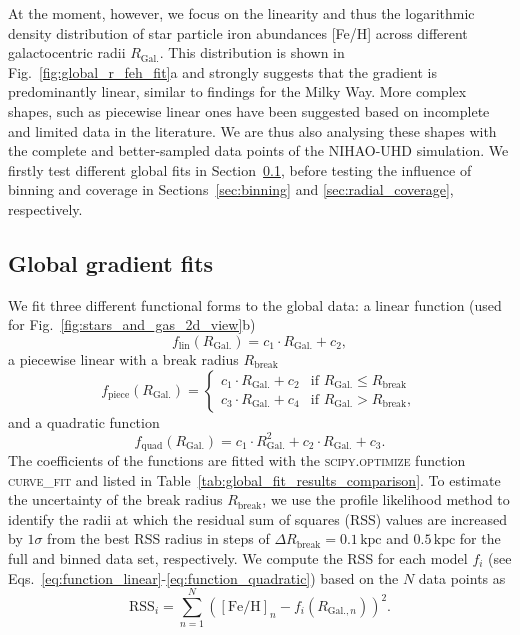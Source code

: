 \documentclass[twocolumn,apj,numberedappendix,appendixfloats,twocolappendix]{openjournal}
\begin{document}
\begin{CJK*}{UTF8}{gbsn}
At the moment, however, we focus on the linearity and thus the logarithmic density distribution of star particle iron abundances [Fe/H] across different galactocentric radii $R_\mathrm{Gal.}$. This distribution is shown in Fig.~\ref{fig:global_r_feh_fit}a and strongly suggests that the gradient is predominantly linear, similar to findings for the Milky Way. More complex shapes, such as piecewise linear ones have been suggested based on incomplete and limited data in the literature. We are thus also analysing these shapes with the complete and better-sampled data points of the NIHAO-UHD simulation. We firstly test different global fits in Section~\ref{sec:global_fits}, before testing the influence of binning and coverage in Sections~\ref{sec:binning} and \ref{sec:radial_coverage}, respectively.

\newpage
\subsection{Global gradient fits}
\label{sec:global_fits}

We fit three different functional forms to the global data: a linear function (used for Fig.~\ref{fig:stars_and_gas_2d_view}b)
\begin{equation}
f_{\text{lin}}(R_\mathrm{Gal.}) = c_1 \cdot R_\mathrm{Gal.} + c_2, \label{eq:function_linear}
\end{equation}
a piecewise linear with a break radius $R_\mathrm{break}$
\begin{equation}
f_{\text{piece}}(R_\mathrm{Gal.}) = 
\begin{cases} 
c_1 \cdot R_\mathrm{Gal.} + c_2 & \text{if } R_\mathrm{Gal.} \leq R_\mathrm{break} \\
c_3 \cdot R_\mathrm{Gal.} + c_4 & \text{if } R_\mathrm{Gal.} > R_\mathrm{break},  \label{eq:function_piecewise}
\end{cases}
\end{equation}
and a quadratic function
\begin{equation}
f_{\text{quad}}(R_\mathrm{Gal.}) = c_1 \cdot R_\mathrm{Gal.}^2 + c_2 \cdot R_\mathrm{Gal.} + c_3.  \label{eq:function_quadratic}
\end{equation}
The coefficients of the functions are fitted with the \textsc{scipy.optimize} function \textsc{curve\_fit} \citep{Scipy} and listed in Table~\ref{tab:global_fit_results_comparison}. To estimate the uncertainty of the break radius $R_\mathrm{break}$, we use the profile likelihood method to identify the radii at which the residual sum of squares (RSS) values are increased by $1\sigma$ from the best RSS radius in steps of $\Delta R_\mathrm{break} = 0.1\,\mathrm{kpc}$ and $0.5\,\mathrm{kpc}$ for the full and binned data set, respectively. We compute the RSS for each model $f_i$ (see Eqs.~\ref{eq:function_linear}-\ref{eq:function_quadratic}) based on the $N$ data points as 
\begin{equation} \label{eq:rss}
    \mathrm{RSS}_i = \sum_{n=1}^N \left( \mathrm{[Fe/H]}_n - f_i(R_{\mathrm{Gal.},n}) \right)^2.
\end{equation}


\end{CJK*}
\end{document}
